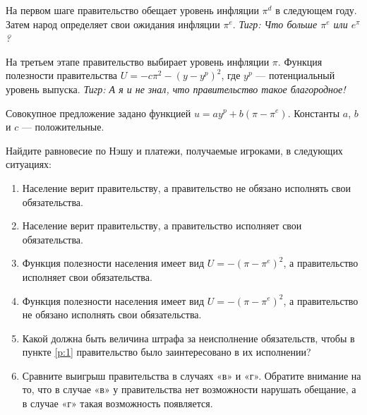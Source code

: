 \begin{problem}
На первом шаге правительство обещает уровень инфляции  $\pi ^{d} $  в следующем году. Затем народ определяет свои ожидания инфляции  $\pi ^{e} $. {\it Тигр: Что больше  $\pi ^{e} $  или  $e^{\pi } $?}\par
На третьем этапе правительство выбирает уровень инфляции  $\pi $.
Функция полезности правительства  $U=-c\pi ^{2} -\left(y-y^{p} \right)^{2} $, где  $y^{p} $  — потенциальный уровень выпуска. {\it Тигр: А я и не знал, что правительство такое благородное!}\par
Совокупное предложение задано функцией  $u=ay^{p} +b\left(\pi -\pi ^{e} \right)$. Константы  $a$,  $b$  и  $c$  — положительные.\par
Найдите равновесие по Нэшу и платежи, получаемые игроками, в следующих ситуациях:\par
\begin{enumerate}
\item       Население верит правительству, а правительство не обязано исполнять свои обязательства.\par
\item      Население верит правительству, а правительство исполняет свои обязательства.\par
\item       Функция полезности населения имеет вид  $U=-\left(\pi -\pi ^{e} \right)^{2} $, а правительство исполняет свои обязательства.\par
\item\label{p:1}      Функция полезности населения имеет вид  $U=-\left(\pi -\pi ^{e} \right)^{2} $, а правительство не обязано исполнять свои обязательства.\par
\item      Какой должна быть величина штрафа за неисполнение обязательств, чтобы в пункте \ref{p:1} правительство было заинтересовано в их исполнении?\par
\item      Сравните выигрыш правительства в случаях «в» и «г». Обратите внимание на то, что в случае «в» у правительства нет возможности нарушать обещание, а в случае «г» такая возможность появляется.
\end{enumerate}


\begin{sol}

\end{sol}
\end{problem}



